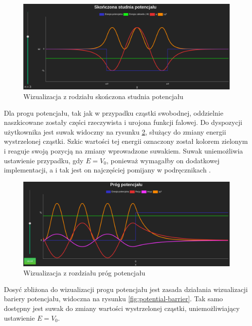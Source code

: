 \documentclass{SGGW-thesis}
\begin{document}
	\begin{figure}[H]
	\includegraphics[width=\textwidth,height=\textheight,keepaspectratio]{fiwell.png} 
	\caption{Wizualizacja z rodziału skończona studnia potencjału}
	\label{fig:fi-well}
	\end{figure}
	
	Dla progu potencjału, tak jak w przypadku cząstki swobodnej, oddzielnie naszkicowane zostały części rzeczywista i urojona funkcji falowej. Do dyspozycji użytkownika jest suwak widoczny na rysunku \ref{fig:potential-jump}, służący do zmiany energii wystrzelonej cząstki. Szkic wartości tej energii oznaczony został kolorem zielonym i reaguje swoją pozycją na zmiany wprowadzone suwakiem. Suwak uniemożliwia ustawienie przypadku, gdy $E=V_0$, ponieważ wymagałby on dodatkowej implementacji, a i tak jest on najczęściej pomijany w podręcznikach \cite{fiz atom} \cite{mechanika kwant} \cite{fiz kwant}.
	
	\begin{figure}[H]
	\includegraphics[width=\textwidth,height=\textheight,keepaspectratio]{jump.png} 
	\caption{Wizualizacja z rozdziału próg potencjału}
	\label{fig:potential-jump}
	\end{figure}
	
	Dosyć zbliżona do wizualizacji progu potencjału jest zasada działania wizualizacji bariery potencjału, widoczna na rysunku \ref{fig:potential-barrier}. Tak samo dostępny jest suwak do zmiany wartości wystrzelonej cząstki, uniemożliwiający ustawienie $E=V_0$.
	
\end{document}
